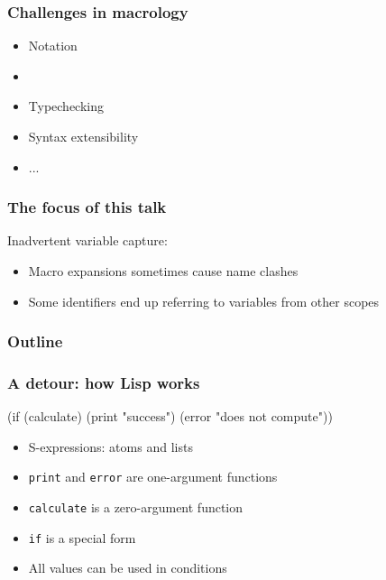 \documentclass[svgnames,hyperref={bookmarks=false}]{beamer}
\begin{document}
\begin{frame}[fragile]
\frametitle{Challenges in macrology}

\begin{itemize}
\item Notation
\item \text{\color{blue}{Variable capture}}
\item Typechecking
\item Syntax extensibility
\item ...
\end{itemize}
\end{frame}

\begin{frame}[fragile]
\frametitle{The focus of this talk}

Inadvertent variable capture:
\begin{itemize}
\item Macro expansions sometimes cause name clashes
\item Some identifiers end up referring to variables from other scopes
\end{itemize}

\end{frame}



\begin{frame}
\frametitle{Outline}
\tableofcontents
\end{frame}

\begin{frame}[fragile]
\frametitle{A detour: how Lisp works}
\begin{semiverbatim}
(if (calculate)
  (print "success")
  (error "does not compute"))
\end{semiverbatim}

\vskip50pt

\begin{itemize}
\item S-expressions: atoms and lists
\item \texttt{print} and \texttt{error} are one-argument functions
\item \texttt{calculate} is a zero-argument function
\item \texttt{if} is a special form
\item All values can be used in conditions
\end{itemize}
\end{frame}
\end{document}
